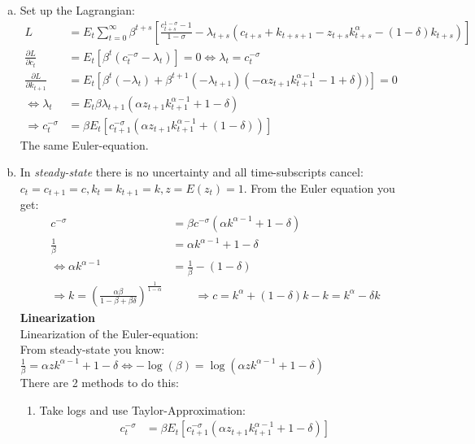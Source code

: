 \documentclass{article}
\begin{document}
\begin{enumerate}[(a)]
\item Set up the Lagrangian:
\begin{align*}
  L &= E_t \sum_{t=0}^\infty \beta^{t+s} \left[\frac{c_{t+s}^{1-\sigma}-1}{1-\sigma} -\lambda_{t+s} \left(c_{t+s} + k_{t+s+1} - z_{t+s}k_{t+s}^\alpha -(1-\delta)k_{t+s}\right) \right]\\
  \frac{\partial L}{\partial c_t} &= E_t \left[\beta^t \left(c_t^{-\sigma}-\lambda_t\right)\right]=0 \Leftrightarrow \lambda_t=c_t^{-\sigma}\\
  \frac{\partial L}{\partial k_{t+1}} &= E_t \left[\beta^t (-\lambda_t) + \beta^{t+1} (-\lambda_{t+1})(-\alpha z_{t+1} k_{t+1}^{\alpha-1}-1+\delta)) \right]=0\\
  \Leftrightarrow \lambda_t &= E_t \beta \lambda_{t+1}(\alpha z_{t+1}k_{t+1}^{\alpha-1}+1-\delta)\\
  \Rightarrow c_t^{-\sigma} &= \beta E_t \left[ c_{t+1}^{-\sigma} (\alpha z_{t+1} k_{t+1}^{\alpha-1} +(1-\delta)) \right]
\end{align*}
The same Euler-equation.
\item In \emph{steady-state} there is no uncertainty and all
    time-subscripts cancel: $c_t = c_{t+1}=c, k_t = k_{t+1}=k, z
    =E(z_t)=1$. From the Euler equation you get:
    \begin{align*}
      c^{-\sigma} &= \beta c^{-\sigma}(\alpha k^{\alpha-1}+1-\delta)\\
      \frac{1}{\beta} &= \alpha k^{\alpha-1} + 1 -\delta\\
      \Leftrightarrow \alpha k^{\alpha-1} &= \frac{1}{\beta} -(1-\delta)\\
      \Rightarrow k =\left(\frac{\alpha \beta}{1-\beta+\beta \delta}\right)^\frac{1}{1-\alpha} &\qquad \Rightarrow c=k^{\alpha} +(1-\delta)k -k= k^\alpha -\delta k
    \end{align*}
\textbf{Linearization\\}
 Linearization of the Euler-equation: \\
From steady-state you know: $\frac{1}{\beta}=\alpha z k^{\alpha-1} + 1-\delta \Leftrightarrow -\log(\beta)=\log(\alpha z k^{\alpha-1} + 1-\delta)$\\
There are 2 methods to do this:
    \begin{enumerate}[(1)]
    \item Take logs and use Taylor-Approximation:
    \begin{align*}
    c_t^{-\sigma} &= \beta E_t \left[ c_{t+1}^{-\sigma} (\alpha z_{t+1} k_{t+1}^{\alpha-1} +1-\delta) \right]\\

\end{align*}
\end{enumerate}
\end{enumerate}
\end{document}
